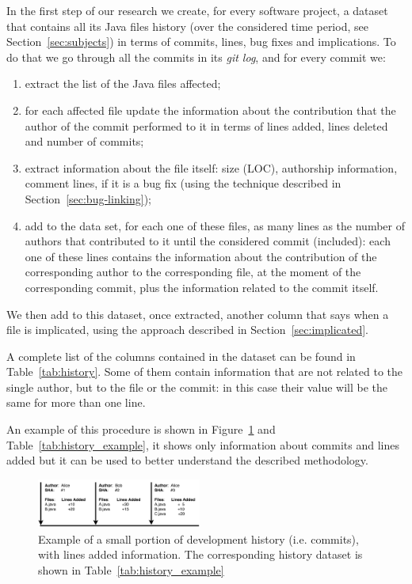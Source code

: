 In the first step of our research we create, for every software project, a dataset that contains all its Java files history (over the considered time period, see Section~\ref{sec:subjects}) in terms of commits, lines, bug fixes and implications. To do that we go through all the commits in its \textit{git log}, and for every commit we:
\begin{enumerate}
\item extract the list of the Java files affected; 
\item for each affected file update the information about the contribution that the author of the commit performed to it in terms of lines added, lines deleted and number of commits;
\item extract information about the file itself: size (LOC), authorship information, comment lines, if it is a bug fix (using the technique described in Section~\ref{sec:bug-linking});
\item add to the data set, for each one of these files, as many lines as the number of authors that contributed to it until the considered commit (included): each one of these lines contains the information about the contribution of the corresponding author to the corresponding file, at the moment of the corresponding commit, plus the information related to the commit itself.
\end{enumerate}

We then add to this dataset, once extracted, another column that says when a file is implicated, using the approach described in Section~\ref{sec:implicated}.

A complete list of the columns contained in the dataset can be found in Table~\ref{tab:history}. Some of them contain information that are not related to the single author, but to the file or the commit: in this case their value will be the same for more than one line.

An example of this procedure is shown in Figure~\ref{fig:history_example} and Table~\ref{tab:history_example}, it shows only information about commits and lines added but it can be used to better understand the described methodology.

\begin{figure}[ht]
    \centering
    \includegraphics[width=0.48\textwidth]{images/history_example.png}
    \caption{Example of a small portion of development history (i.e. commits), with lines added information. The corresponding history dataset is shown in Table~\ref{tab:history_example}}
    \label{fig:history_example}
\end{figure}

